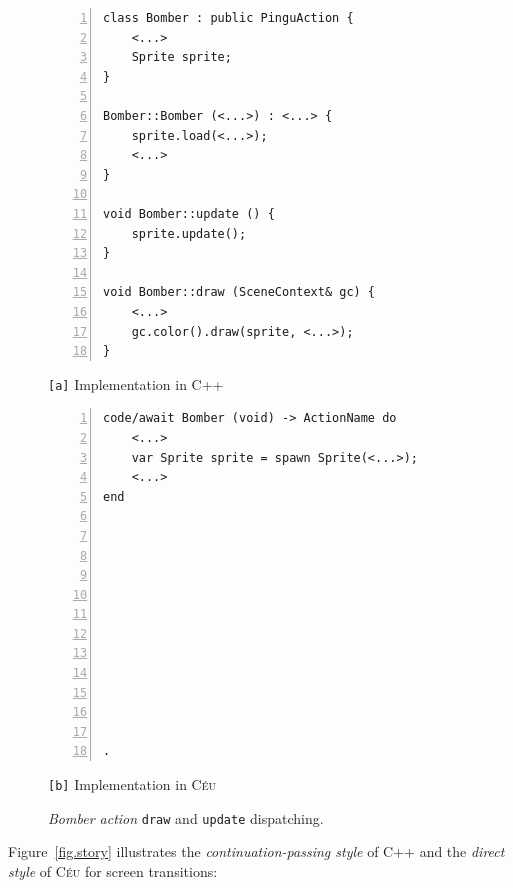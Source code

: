 \documentclass{vgtc}                          %
\newcommand{\CEU}{\textsc{C\'{e}u}\xspace}
\newcommand{\code}[1] {{\small{\texttt{#1}}}}
\newcommand{\ax}{\code{[a]}\xspace}
\newcommand{\bx}{\code{[b]}\xspace}
\begin{document}
\begin{figure}[t]
\begin{minipage}[t]{0.50\linewidth}
\begin{lstlisting}[numbers=left,xleftmargin=3em]
class Bomber : public PinguAction {
    <...>
    Sprite sprite;
}

Bomber::Bomber (<...>) : <...> {
    sprite.load(<...>);
    <...>
}

void Bomber::update () {
    sprite.update();
}

void Bomber::draw (SceneContext& gc) {
    <...>
    gc.color().draw(sprite, <...>);
}
\end{lstlisting}
\centering\small{\ax Implementation in C++}
\end{minipage}
%
\begin{minipage}[t]{0.50\linewidth}
\begin{lstlisting}[numbers=left,xleftmargin=3em]
code/await Bomber (void) -> ActionName do
    <...>
    var Sprite sprite = spawn Sprite(<...>);
    <...>
end












.
\end{lstlisting}
\centering\small{\bx Implementation in \CEU}
\end{minipage}
\caption{ \emph{Bomber action} \code{draw} and \code{update} dispatching.
\label{lst.hier}
}
\end{figure}

Figure~\ref{fig.story} illustrates the \emph{continuation-passing style} of
C++ and the \emph{direct style} of \CEU for screen transitions:
\end{document}
